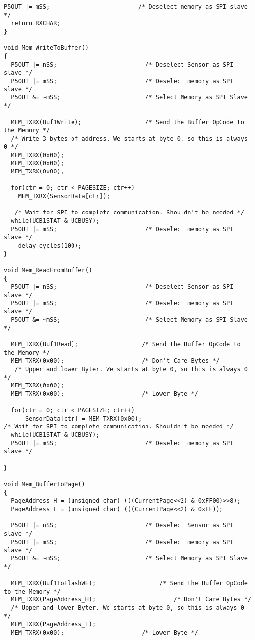 \begin{lstlisting}[caption=Main.c,label=Code4]
  P5OUT |= mSS;                         /* Deselect memory as SPI slave */ 
  return RXCHAR;
}

void Mem_WriteToBuffer()
{
  P5OUT |= nSS;                         /* Deselect Sensor as SPI slave */ 
  P5OUT |= mSS;                         /* Deselect memory as SPI slave */ 
  P5OUT &= ~mSS;                        /* Select Memory as SPI Slave */

  MEM_TXRX(Buf1Write);                  /* Send the Buffer OpCode to the Memory */
  /* Write 3 bytes of address. We starts at byte 0, so this is always 0 */
  MEM_TXRX(0x00);                       
  MEM_TXRX(0x00);
  MEM_TXRX(0x00);
  
  for(ctr = 0; ctr < PAGESIZE; ctr++)
    MEM_TXRX(SensorData[ctr]);

   /* Wait for SPI to complete communication. Shouldn't be needed */
  while(UCB1STAT & UCBUSY);            
  P5OUT |= mSS;                         /* Deselect memory as SPI slave */ 
  __delay_cycles(100);
}

void Mem_ReadFromBuffer()
{
  P5OUT |= nSS;                         /* Deselect Sensor as SPI slave */ 
  P5OUT |= mSS;                         /* Deselect memory as SPI slave */ 
  P5OUT &= ~mSS;                        /* Select Memory as SPI Slave */
  
  MEM_TXRX(Buf1Read);                  /* Send the Buffer OpCode to the Memory */
  MEM_TXRX(0x00);                      /* Don't Care Bytes */
   /* Upper and lower Byter. We starts at byte 0, so this is always 0 */
  MEM_TXRX(0x00);                     
  MEM_TXRX(0x00);                      /* Lower Byte */
  
  for(ctr = 0; ctr < PAGESIZE; ctr++)
      SensorData[ctr] = MEM_TXRX(0x00);
/* Wait for SPI to complete communication. Shouldn't be needed */
  while(UCB1STAT & UCBUSY);             
  P5OUT |= mSS;                         /* Deselect memory as SPI slave */ 
  
}

void Mem_BufferToPage()
{
  PageAddress_H = (unsigned char) (((CurrentPage<<2) & 0xFF00)>>8);
  PageAddress_L = (unsigned char) (((CurrentPage<<2) & 0xFF));
  
  P5OUT |= nSS;                         /* Deselect Sensor as SPI slave */ 
  P5OUT |= mSS;                         /* Deselect memory as SPI slave */ 
  P5OUT &= ~mSS;                        /* Select Memory as SPI Slave */
  
  MEM_TXRX(Buf1ToFlashWE);                  /* Send the Buffer OpCode to the Memory */
  MEM_TXRX(PageAddress_H);                      /* Don't Care Bytes */
  /* Upper and lower Byter. We starts at byte 0, so this is always 0 */
  MEM_TXRX(PageAddress_L);                      
  MEM_TXRX(0x00);                      /* Lower Byte */
  

\end{lstlisting}
